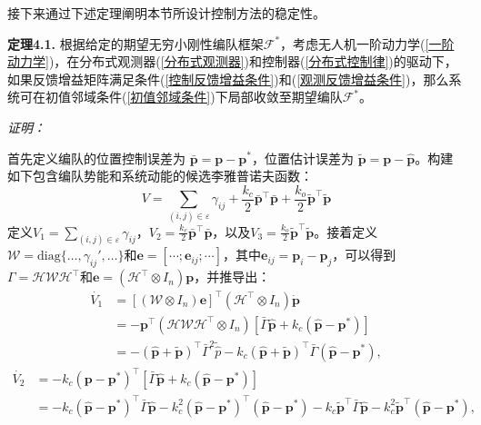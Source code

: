 接下来通过下述定理阐明本节所设计控制方法的稳定性。

\textbf{定理4.1.} 根据给定的期望无穷小刚性编队框架$\mathcal{F}^*$，考虑无人机一阶动力学(\ref{一阶动力学})，在分布式观测器(\ref{分布式观测器})和控制器(\ref{分布式控制律})的驱动下，如果反馈增益矩阵满足条件(\ref{控制反馈增益条件})和(\ref{观测反馈增益条件})，那么系统可在初值邻域条件(\ref{初值邻域条件})下局部收敛至期望编队$\mathcal{F}^*$。

\textit{证明：}

首先定义编队的位置控制误差为 $\bar{\mathbf{p}} = \mathbf{p} - \mathbf{p}^*$，位置估计误差为 $\tilde{\mathbf{p}} =\mathbf{p}- \hat{\mathbf{p}}$。构建如下包含编队势能和系统动能的候选李雅普诺夫函数：
\begin{equation}
	V = \sum_{(i,j) \in \varepsilon} \gamma_{ij} + 
	\frac{k_c}{2} \bar{\mathbf{p}}^\top \bar{\mathbf{p}} + \frac{k_o}{2} \tilde{\mathbf{p}}^\top \tilde{\mathbf{p}}
	\label{李雅普诺夫函数}
\end{equation}
定义$V_1=\sum_{(i,j) \in \varepsilon}\gamma_{ij}$，$V_2=\frac{k_c}{2} \bar{\mathbf{p}}^\top \bar{\mathbf{p}}$，以及$V_3=\frac{k_o}{2} \tilde{\mathbf{p}}^\top \tilde{\mathbf{p}}$。接着定义$\mathcal{W}=\text{diag}\{\dots,\gamma_{ij}',\dots\}$和$\mathbf{e}=[\cdots;\mathbf{e}_{ij};\cdots]$，其中$\mathbf{e}_{ij}=\mathbf{p}_i-\mathbf{p}_j$，可以得到$\Gamma=\mathcal{H}\mathcal{W}\mathcal{H}^\top$和$\mathbf{e}=(\mathcal{H}^\top \otimes I_n)\mathbf{p}$，并推导出：
\begin{align}
	\dot{V_1} &= 
	\left[(\mathcal{W} \otimes I_n)\mathbf{e}\right]^\top
	(\mathcal{H}^\top \otimes I_n)\dot{\mathbf{p}} \nonumber \\
	&=
	-\mathbf{p}^\top(\mathcal{H}\mathcal{W}\mathcal{H}^\top \otimes I_n)
	\left[\bar{\Gamma}\hat{\mathbf{p}}+k_c(\hat{\mathbf{p}}-\mathbf{p}^*)\right] \nonumber \\
	&=
	-(\hat{\mathbf{p}}+\tilde{\mathbf{p}})^\top \bar{\Gamma}^2 \tilde{\hat{p}} - k_c(\hat{\mathbf{p}}+\tilde{\mathbf{p}})^\top \bar{\Gamma} (\hat{\mathbf{p}}-\mathbf{p}^*),
	\label{V1导数}
\end{align}
\begin{align}
	\dot{V_2} &=
	-k_c(\mathbf{p}-\mathbf{p}^*)^\top
	\left[\bar{\Gamma}\hat{\mathbf{p}}+k_c(\hat{\mathbf{p}}-\mathbf{p}^*)\right] \nonumber \\
	&= 
	-k_c(\hat{\mathbf{p}}-\mathbf{p}^*)^\top \bar{\Gamma}\hat{\mathbf{p}} -
	k_c^2(\hat{\mathbf{p}}-\mathbf{p}^*)^\top (\hat{\mathbf{p}}-\mathbf{p}^*) - 
	k_c \tilde{\mathbf{p}}^\top \bar{\Gamma} \hat{\mathbf{p}} - 
	k_c^2 \tilde{\mathbf{p}}^\top (\hat{\mathbf{p}}-\mathbf{p}^*),
	\label{V2导数}
\end{align}
